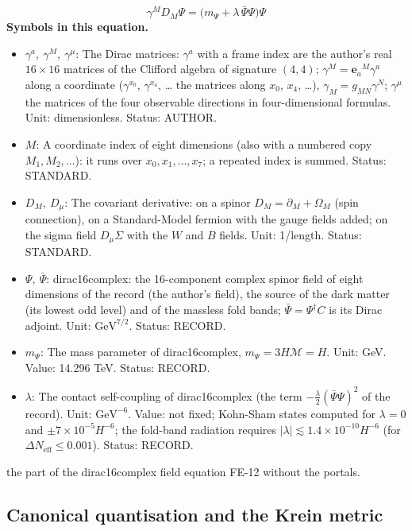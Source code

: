 \documentclass[
  10pt,
]{article}
\providecommand{\tightlist}{%
  \setlength{\itemsep}{0pt}\setlength{\parskip}{0pt}}
\begin{document}
\[
\gamma^MD_M\Psi = \big(m_\Psi + \lambda\,\bar\Psi\Psi\big)\Psi
\] \textbf{Symbols in this equation.}

\begin{itemize}
\tightlist
\item
  \(\gamma^a,\ \gamma^M,\ \gamma^\mu\): The Dirac matrices: \(\gamma^a\)
  with a frame index are the author's real \(16 \times 16\) matrices of
  the Clifford algebra of signature \((4, 4)\);
  \(\gamma^M = \mathbf{e}_a{}^M\gamma^a\) along a coordinate
  (\(\gamma^{x_0}\), \(\gamma^{x_4}\), \ldots{} the matrices along
  \(x_0\), \(x_4\), \ldots), \(\gamma_M = g_{MN}\gamma^N\);
  \(\gamma^\mu\) the matrices of the four observable directions in
  four-dimensional formulas. Unit: dimensionless. Status: AUTHOR.
\item
  \(M\): A coordinate index of eight dimensions (also with a numbered
  copy \(M_1, M_2, \dots\)): it runs over \(x_0, x_1, \dots, x_7\); a
  repeated index is summed. Status: STANDARD.
\item
  \(D_M,\ D_\mu\): The covariant derivative: on a spinor
  \(D_M = \partial_M + \Omega_M\) (spin connection), on a Standard-Model
  fermion with the gauge fields added; on the sigma field
  \(D_\mu\Sigma\) with the \(W\) and \(B\) fields. Unit: 1/length.
  Status: STANDARD.
\item
  \(\Psi,\ \bar\Psi\): dirac16complex: the 16-component complex spinor
  field of eight dimensions of the record (the author's field), the
  source of the dark matter (its lowest odd level) and of the massless
  fold bands; \(\bar\Psi = \Psi^\dagger C\) is its Dirac adjoint. Unit:
  \(\mathrm{GeV}^{7/2}\). Status: RECORD.
\item
  \(m_\Psi\): The mass parameter of dirac16complex,
  \(m_\Psi = 3H\mathcal{M} = H\). Unit: GeV. Value: 14.296 TeV. Status:
  RECORD.
\item
  \(\lambda\): The contact self-coupling of dirac16complex (the term
  \(-\frac{\lambda}{2}(\bar\Psi\Psi)^2\) of the record). Unit:
  \(\mathrm{GeV}^{-6}\). Value: not fixed; Kohn-Sham states computed for
  \(\lambda = 0\) and \(\pm7\times10^{-5}H^{-6}\); the fold-band
  radiation requires
  \(\lvert\lambda\rvert \lesssim 1.4\times10^{-10}H^{-6}\) (for
  \(\Delta N_{\mathrm{eff}} \le 0.001\)). Status: RECORD.
\end{itemize}

the part of the dirac16complex field equation FE-12 without the portals.

\hypertarget{canonical-quantisation-and-the-krein-metric}{%
\subsection{Canonical quantisation and the Krein
metric}\label{canonical-quantisation-and-the-krein-metric}}
\end{document}
